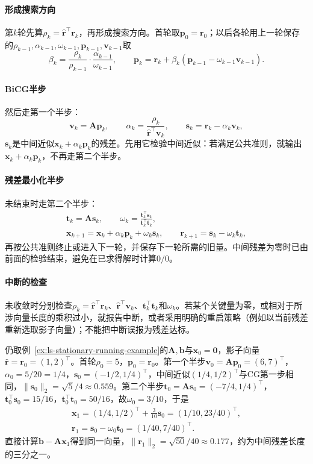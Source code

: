 \paragraph{形成搜索方向}
第$k$轮先算$\rho_k=\widehat{\bm r}^\top\bm r_k$，再形成搜索方向。首轮取$\bm p_0=\bm r_0$；以后各轮用上一轮保存的$\rho_{k-1},\alpha_{k-1},\omega_{k-1},\bm p_{k-1},\bm v_{k-1}$取
\[
 \beta_k=\frac{\rho_k}{\rho_{k-1}}\cdot\frac{\alpha_{k-1}}{\omega_{k-1}},\qquad
 \bm p_k=\bm r_k+\beta_k(\bm p_{k-1}-\omega_{k-1}\bm v_{k-1}).
\]

\paragraph{BiCG半步}
然后走第一个半步：
\[
 \bm v_k=\bm A\bm p_k,\qquad
 \alpha_k=\frac{\rho_k}{\widehat{\bm r}^\top\bm v_k},\qquad
 \bm s_k=\bm r_k-\alpha_k\bm v_k ,
\]
$\bm s_k$是中间近似$\bm x_k+\alpha_k\bm p_k$的残差。先用它检验中间近似：若满足公共准则，就输出$\bm x_k+\alpha_k\bm p_k$，不再走第二个半步。

\paragraph{残差最小化半步}
未结束时走第二个半步：
\[
 \begin{gathered}
 \bm t_k=\bm A\bm s_k,\qquad \omega_k=\frac{\bm t_k^\top\bm s_k}{\bm t_k^\top\bm t_k},\\
 \bm x_{k+1}=\bm x_k+\alpha_k\bm p_k+\omega_k\bm s_k,\qquad
 \bm r_{k+1}=\bm s_k-\omega_k\bm t_k ,
 \end{gathered}
\]
再按公共准则终止或进入下一轮，并保存下一轮所需的旧量。中间残差为零时已由前面的检验结束，避免在已求得解时计算$0/0$。

\paragraph{中断的检查}
未收敛时分别检查$\rho_k=\widehat{\bm r}^\top\bm r_k$、$\widehat{\bm r}^\top\bm v_k$、$\bm t_k^\top\bm t_k$和$\omega_k$。若某个关键量为零，或相对于所涉向量长度的乘积过小，就报告中断，或者采用明确的重启策略（例如以当前残差重新选取影子向量）；不能把中断误报为残差达标。

\begin{example}[BiCGSTAB在贯穿例上的一轮]
\label{ex:ls-bicgstab-one-step}
仍取例~\ref{ex:ls-stationary-running-example}的$\bm A,\bm b$与$\bm x_0=\bm 0$，影子向量$\widehat{\bm r}=\bm r_0=(1,2)^\top$。首轮$\rho_0=5$，$\bm p_0=\bm r_0$。第一个半步$\bm v_0=\bm A\bm p_0=(6,7)^\top$，$\alpha_0=5/20=1/4$，$\bm s_0=(-1/2,1/4)^\top$，中间近似$(1/4,1/2)^\top$与CG第一步相同，$\lVert\bm s_0\rVert_2=\sqrt5/4\approx0.559$。第二个半步$\bm t_0=\bm A\bm s_0=(-7/4,1/4)^\top$，$\bm t_0^\top\bm s_0=15/16$，$\bm t_0^\top\bm t_0=50/16$，故$\omega_0=3/10$，于是
\[
 \begin{gathered}
 \bm x_1=(1/4,1/2)^\top+\tfrac3{10}\bm s_0=(1/10,23/40)^\top,\\
 \bm r_1=\bm s_0-\omega_0\bm t_0=(1/40,7/40)^\top .
 \end{gathered}
\]
直接计算$\bm b-\bm A\bm x_1$得到同一向量，$\lVert\bm r_1\rVert_2=\sqrt{50}/40\approx0.177$，约为中间残差长度的三分之一。
\end{example}

